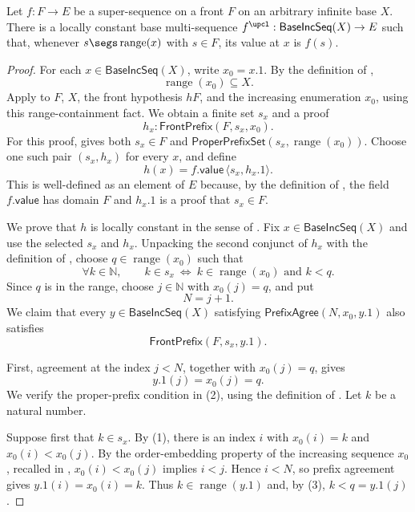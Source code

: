 \begin{lemma}
Let $f:F\to E$ be a super-sequence on a front $F$ on an arbitrary infinite
base $X$.  There is a locally constant base multi-sequence
$f^{\upcl}:\mathsf{BaseIncSeq}(X)\to E$ such that, whenever
$s\segs\operatorname{range}(x)$ with $s\in F$, its value at $x$ is $f(s)$.
\end{lemma}
\begin{proof}
For each $x\in\mathsf{BaseIncSeq}(X)$, write $x_0=x.1$.  By the definition
of ,
\[
  \operatorname{range}(x_0)\subseteq X.
\]
Apply  to $F$, $X$, the front hypothesis $hF$,
and the increasing enumeration $x_0$, using this range-containment fact.
We obtain a finite set $s_x$ and a proof
\[
  h_x:\mathsf{FrontPrefix}(F,s_x,x_0).
\]
For this proof,  gives both
$s_x\in F$ and
\(\mathsf{ProperPrefixSet}(s_x,\operatorname{range}(x_0))\).
Choose one such pair $(s_x,h_x)$ for every $x$, and define
\[
  h(x)=f.\mathsf{value}\,\langle s_x,h_x.1\rangle.
\]
This is well-defined as an element of $E$ because, by the definition of
, the field $f.\mathsf{value}$ has domain $F$ and
$h_x.1$ is a proof that $s_x\in F$.

We prove that $h$ is locally constant in the sense of
.  Fix $x\in\mathsf{BaseIncSeq}(X)$ and use
the selected $s_x$ and $h_x$.  Unpacking the second conjunct of
$h_x$ with the definition of , choose
\(q\in\operatorname{range}(x_0)\) such that
\[
  \forall k\in\mathbb N,\qquad
  k\in s_x\ \Longleftrightarrow\ k\in\operatorname{range}(x_0)
  \text{ and } k<q.                                      \tag{1}
\]
Since $q$ is in the range, choose $j\in\mathbb N$ with
\(x_0(j)=q\), and put
\[
  N=j+1.
\]
We claim that every $y\in\mathsf{BaseIncSeq}(X)$ satisfying
\(\mathsf{PrefixAgree}(N,x_0,y.1)\) also satisfies
\[
  \mathsf{FrontPrefix}(F,s_x,y.1).                         \tag{2}
\]

First, agreement at the index $j<N$, together with $x_0(j)=q$, gives
\[
  y.1(j)=x_0(j)=q.                                         \tag{3}
\]
We verify the proper-prefix condition in (2), using the definition of
.  Let $k$ be a natural number.

Suppose first that $k\in s_x$.  By (1), there is an index $i$ with
$x_0(i)=k$ and $x_0(i)<x_0(j)$.  By the order-embedding property of the
increasing sequence $x_0$, recalled in ,
$x_0(i)<x_0(j)$ implies $i<j$.  Hence $i<N$, so prefix agreement gives
\(y.1(i)=x_0(i)=k\).  Thus
\(k\in\operatorname{range}(y.1)\) and, by (3), $k<q=y.1(j)$.


\end{proof}
